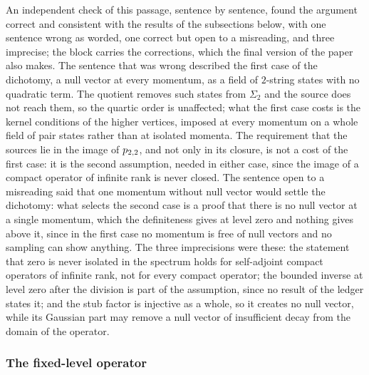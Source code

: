 \noindent{} An independent check of this passage, sentence by sentence, found the argument correct and consistent with the results of the subsections below, with one sentence wrong as worded, one correct but open to a misreading, and three imprecise; the block carries the corrections, which the final version of the paper also makes.
The sentence that was wrong described the first case of the dichotomy, a null vector at every momentum, as a field of $2$-string states with no quadratic term.
The quotient removes such states from $\Sigma_2$ and the source does not reach them, so the quartic order is unaffected; what the first case costs is the kernel conditions of the higher vertices, imposed at every momentum on a whole field of pair states rather than at isolated momenta.
The requirement that the sources lie in the image of $p_{2,2}$, and not only in its closure, is not a cost of the first case: it is the second assumption, needed in either case, since the image of a compact operator of infinite rank is never closed.
The sentence open to a misreading said that one momentum without null vector would settle the dichotomy: what selects the second case is a proof that there is no null vector at a single momentum, which the definiteness gives at level zero and nothing gives above it, since in the first case no momentum is free of null vectors and no sampling can show anything.
The three imprecisions were these: the statement that zero is never isolated in the spectrum holds for self-adjoint compact operators of infinite rank, not for every compact operator; the bounded inverse at level zero after the division is part of the assumption, since no result of the ledger states it; and the stub factor is injective as a whole, so it creates no null vector, while its Gaussian part may remove a null vector of insufficient decay from the domain of the operator.



\subsubsection{The fixed-level operator}
\label{sec:mom:operator}


